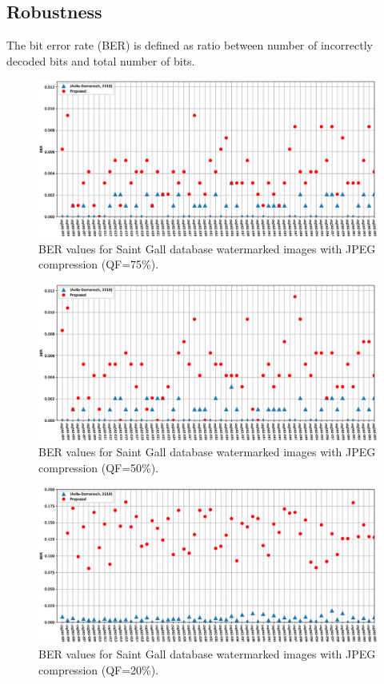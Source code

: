 \documentclass[runningheads]{llncs}
\begin{document}
\subsection{Robustness}
The bit error rate (BER) is defined as ratio between number of incorrectly decoded bits and total number of bits.
\begin{figure}[H]	%
	\begin{center}
		\includegraphics[width=\textwidth]{ber75.eps}
	\end{center}
	\caption{BER values for Saint Gall database watermarked images with JPEG compression (QF=75\%).}
	\label{ber75}
\end{figure}
\begin{figure}[H]	%
	\begin{center}
		\includegraphics[width=\textwidth]{ber50.eps}
	\end{center}
	\caption{BER values for Saint Gall database watermarked images with JPEG compression (QF=50\%).}
	\label{ber50}
\end{figure}
\begin{figure}[H]	%
	\begin{center}
		\includegraphics[width=\textwidth]{ber20.eps}
	\end{center}
	\caption{BER values for Saint Gall database watermarked images with JPEG compression (QF=20\%).}
	\label{ber20}
\end{figure}
\end{document}
